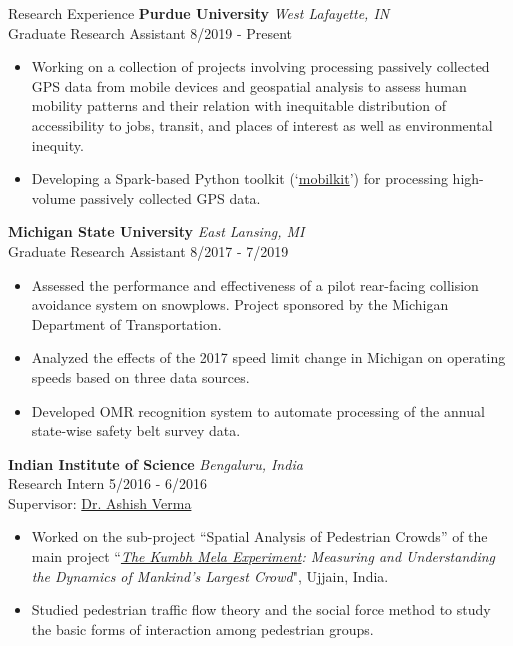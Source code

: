 \documentclass{CV} %
\begin{document}
\begin{rSection}{Research Experience}
    {\bf Purdue University} \hfill {\em West Lafayette, IN}
    \\ Graduate Research Assistant \hfill {8/2019 - Present}
    \begin{itemize}[noitemsep]
        \item Working on a collection of projects involving processing passively collected GPS data from mobile devices and geospatial analysis to assess human mobility patterns and their relation with inequitable distribution of accessibility to jobs, transit, and places of interest as well as environmental inequity.
        \item Developing a Spark-based Python toolkit (`\href{https://github.com/rvanxer/mk}{mobilkit}') for processing high-volume passively collected GPS data.
    \end{itemize}
    {\bf Michigan State University} \hfill {\em East Lansing, MI}
    \\ Graduate Research Assistant \hfill {8/2017 - 7/2019}
    \begin{itemize}[noitemsep]
        \item Assessed the performance and effectiveness of a pilot rear-facing collision avoidance system on snowplows. Project sponsored by the Michigan Department of Transportation.
        \item Analyzed the effects of the 2017 speed limit change in Michigan on operating speeds based on three data sources.
        \item Developed OMR recognition system to automate processing of the annual state-wise safety belt survey data.
    \end{itemize}
    {\bf Indian Institute of Science} \hfill {\em Bengaluru, India}
    \\ Research Intern \hfill {5/2016 - 6/2016}
    \\ Supervisor: \href{http://civil.iisc.ernet.in/~ashishv/}{Dr. Ashish Verma}
    \begin{itemize}[noitemsep]
        \item Worked on the sub-project ``Spatial Analysis of Pedestrian Crowds” of the main project ``\textit{\href{http://www.the-kumbh-mela-experiment.com/}{The Kumbh Mela Experiment}: Measuring and Understanding the Dynamics of Mankind’s Largest Crowd}", Ujjain, India.
        \item Studied pedestrian traffic flow theory and the social force method to study the basic forms of interaction among pedestrian groups.
    \end{itemize}
\end{rSection}
\end{document}
